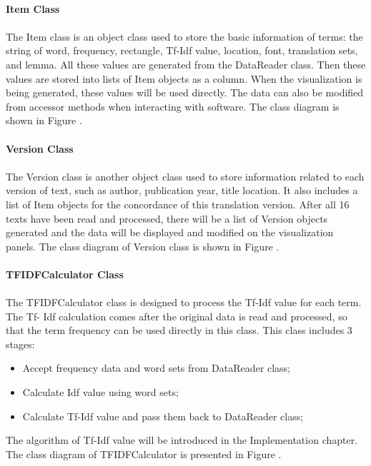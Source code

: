 \paragraph{Item Class}

\paragraph[]{}

The Item class is an object class used to store the basic information of terms: the string of word, frequency, rectangle, Tf-Idf value, location, font, translation sets, and lemma. All these values are generated from the DataReader class. Then these values are stored into lists of Item objects as a column. When the visualization is being generated, these values will be used directly. The data can also be modified from accessor methods when interacting with software. The class diagram is shown in Figure \label{concordance}.

\paragraph{Version Class}

\paragraph[]{}
The Version class is another object class used to store information related to each version of text, such as author, publication year, title location. It also includes a list of Item objects for the concordance of this translation version. After all 16 texts have been read and processed, there will be a list of Version objects generated and the data will be displayed and modified on the visualization panels. The class diagram of Version class is shown in Figure \label{verson}.

\paragraph{TFIDFCalculator Class}

\paragraph[]{}
The TFIDFCalculator class is designed to process the Tf-Idf value for each term. The Tf- Idf calculation comes after the original data is read and processed, so that the term frequency can be used directly in this class. This class includes 3 stages:
\begin{itemize}
	\item \textbf{}Accept frequency data and word sets from DataReader class;
	\item \textbf{}Calculate Idf value using word sets;
	\item \textbf{}Calculate Tf-Idf value and pass them back to DataReader class;
\end{itemize} 
The algorithm of Tf-Idf value will be introduced in the Implementation chapter. The class diagram of TFIDFCalculator is presented in Figure \label{tFiDFCalculator}.

